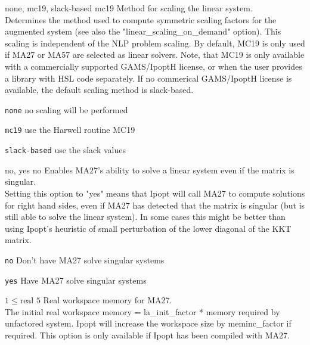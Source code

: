 %
{\ttfamily none, mc19, slack-based}%
{mc19}%
{Method for scaling the linear system.\\
Determines the method used to compute symmetric scaling factors for the augmented system (see also the "linear\_scaling\_on\_demand" option).  This scaling is independent of the NLP problem scaling.  By default, MC19 is only used if MA27 or MA57 are selected as linear solvers. Note, that MC19 is only available with a commercially supported GAMS/IpoptH license, or when the user provides a library with HSL code separately. If no commerical GAMS/IpoptH license is available, the default scaling method is slack-based.}%
{\begin{list}{}{
\setlength{\parsep}{0em}
\setlength{\leftmargin}{5ex}
\setlength{\labelwidth}{2ex}
\setlength{\itemindent}{0ex}
\setlength{\topsep}{0pt}}
\item[\texttt{none}] no scaling will be performed
\item[\texttt{mc19}] use the Harwell routine MC19
\item[\texttt{slack-based}] use the slack values
\end{list}
}

%
{\ttfamily no, yes}%
{no}%
{Enables MA27's ability to solve a linear system even if the matrix is singular.\\
Setting this option to "yes" means that Ipopt will call MA27 to compute solutions for right hand sides, even if MA27 has detected that the matrix is singular (but is still able to solve the linear system). In some cases this might be better than using Ipopt's heuristic of small perturbation of the lower diagonal of the KKT matrix.}%
{\begin{list}{}{
\setlength{\parsep}{0em}
\setlength{\leftmargin}{5ex}
\setlength{\labelwidth}{2ex}
\setlength{\itemindent}{0ex}
\setlength{\topsep}{0pt}}
\item[\texttt{no}] Don't have MA27 solve singular systems
\item[\texttt{yes}] Have MA27 solve singular systems
\end{list}
}

%
{$1\leq\textrm{real}$}%
{$5$}%
{Real workspace memory for MA27.\\
The initial real workspace memory = la\_init\_factor * memory required by unfactored system. Ipopt will increase the workspace size by meminc\_factor if required.  This option is only available if  Ipopt has been compiled with MA27.}%
{}

